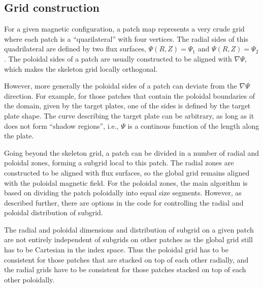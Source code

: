 \subsection{Grid construction}

For a given magnetic configuration, a patch map represents a very
crude grid where each patch is a ``quarilateral'' with four vertices.
The radial sides of this quadrilateral are defined by two flux
surfaces, $\Psi(R,Z)=\Psi_1$ and $\Psi(R,Z)=\Psi_2$. The poloidal
sides of a patch are usually constructed to be aligned with $\nabla
\Psi$, which makes the skeleton grid locally orthogonal. 

However, more generally the poloidal sides of a patch can deviate from
the $\nabla \Psi$ direction. For example, for those patches that
contain the poloidal boundaries of the domain, given by the target
plates, one of the sides is defined by the target plate shape. The
curve describing the target plate can be arbitrary, as long as it does
not form ``shadow regions'', i.e., $\Psi$ is a continous function of
the length along the plate.

Going beyond the skeleton grid, a patch can be divided in a number of
radial and poloidal zones, forming a subgrid local to this patch. The
radial zones are constructed to be aligned with flux surfaces, so the
global grid remains aligned with the poloidal magnetic field. For the
poloidal zones, the main algorithm is based on dividing the patch
poloidally into equal size segments. However, as described further,
there are options in the code for controlling the radial and poloidal
distribution of subgrid.

The radial and poloidal dimensions and distribution of subgrid on a
given patch are not entirely independent of subgrids on other patches
as the global grid still has to be Cartesian in the index space. Thus
the poloidal grid has to be consistent for those patches that are
stacked on top of each other radially, and the radial grids have to be
consistent for those patches stacked on top of each other poloidally.
